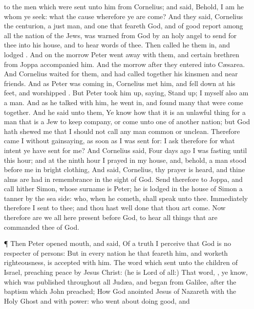 {to the
men
which were
sent
unto
him
from
Cornelius; and
said,
Behold,
I
am he
whom ye
seek:
what
{} the
cause
wherefore
ye are
come?
And they
said,
Cornelius the
centurion, a
just
man,
and one that
feareth
God,
and of good
report
among
all the
nation of the
Jews, was warned from
God
by an
holy
angel to send
for
thee
into
his
house,
and to
hear
words
of
thee.
Then called
he
them
in, and
lodged
{}.
And on the
morrow
Peter went
away
with
them,
and
certain
brethren
from
Joppa
accompanied
him.
And the morrow
after they
entered
into
Cæsarea.
And
Cornelius waited
for
them, and
had called
together
his
kinsmen
and
near
friends.
And
as
Peter
was coming
in,
Cornelius
met
him, and fell
down
at his
feet, and
worshipped
{}.
But
Peter
took
him
up,
saying, Stand
up;
I
myself
also
am a
man.
And as he talked
with
him, he went
in,
and
found
many that were come
together.
And he
said
unto
them,
Ye
know how
that it is an unlawful
thing for a
man that
is a
Jew to keep
company,
or come
unto one of another
nation;
but
God hath
shewed
me
that I
should
not
call any
man
common
or
unclean.
Therefore came
I
{} without
gainsaying, as soon as I was sent
for: I
ask
therefore for
what
intent ye have sent
for
me?
And
Cornelius
said,
Four
days
ago I
was
fasting
until
this
hour;
and at the
ninth
hour I
prayed
in
my
house,
and,
behold, a
man
stood
before
me
in
bright
clothing,
And
said,
Cornelius,
thy
prayer is
heard,
and
thine
alms are had in
remembrance in the sight
of
God.
Send
therefore
to
Joppa,
and call
hither
Simon,
whose surname
is
Peter;
he is
lodged
in the
house
of
{}
Simon a
tanner
by the sea
side:
who, when he
cometh, shall
speak unto
thee.
Immediately
therefore I
sent
to
thee;
and
thou
hast
well
done that thou art
come.
Now
therefore are
we
all here
present
before
God, to
hear all
things
that are
commanded
thee
of
God.
\par }{\PP {}¶
Then
Peter
opened
{}
mouth, and
said,
Of a
truth I
perceive
that
God
is
no respecter of
persons:
But
in
every
nation
he that
feareth
him,
and
worketh
righteousness,
is
accepted with
him.
The
word
which
{}
sent unto the
children of
Israel,
preaching
peace
by
Jesus
Christ: (he
is
Lord of
all:)
That
word,
{},
ye
know, which was
published
throughout
all
Judæa, and
began
from
Galilee,
after the
baptism
which
John
preached;
How
God
anointed
Jesus
of
Nazareth with the
Holy
Ghost
and with
power:
who went
about doing
good,
and
}
